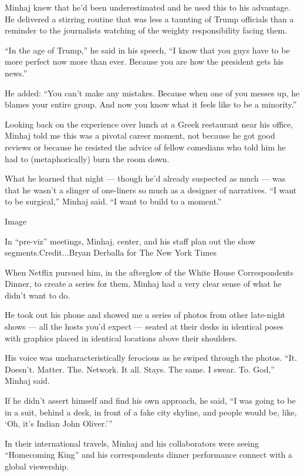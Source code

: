 Minhaj knew that he'd been underestimated and he used this to his
advantage. He delivered a stirring routine that was less a taunting of
Trump officials than a reminder to the journalists watching of the
weighty responsibility facing them.

``In the age of Trump,'' he said in his speech, ``I know that you guys
have to be more perfect now more than ever. Because you are how the
president gets his news.''

He added: ``You can't make any mistakes. Because when one of you messes
up, he blames your entire group. And now you know what it feels like to
be a minority.''

Looking back on the experience over lunch at a Greek restaurant near his
office, Minhaj told me this was a pivotal career moment, not because he
got good reviews or because he resisted the advice of fellow comedians
who told him he had to (metaphorically) burn the room down.

What he learned that night --- though he'd already suspected as much ---
was that he wasn't a slinger of one-liners so much as a designer of
narratives. ``I want to be surgical,'' Minhaj said. ``I want to build to
a moment.''

Image

In ``pre-viz'' meetings, Minhaj, center, and his staff plan out the show
segments.Credit...Bryan Derballa for The New York Times

When Netflix pursued him, in the afterglow of the White House
Correspondents Dinner, to create a series for them, Minhaj had a very
clear sense of what he didn't want to do.

He took out his phone and showed me a series of photos from other
late-night shows --- all the hosts you'd expect --- seated at their
desks in identical poses with graphics placed in identical locations
above their shoulders.

His voice was uncharacteristically ferocious as he swiped through the
photos. ``It. Doesn't. Matter. The. Network. It all. Stays. The same. I
swear. To. God,'' Minhaj said.

If he didn't assert himself and find his own approach, he said, ``I was
going to be in a suit, behind a desk, in front of a fake city skyline,
and people would be, like, `Oh, it's Indian John Oliver.'''

In their international travels, Minhaj and his collaborators were seeing
``Homecoming King'' and his correspondents dinner performance connect
with a global viewership.

